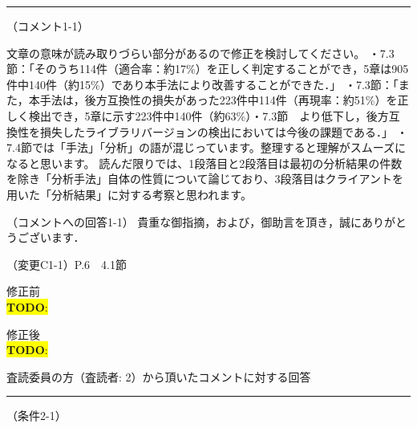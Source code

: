 \documentclass{jarticle} %
\newcommand{\todo}[1]{\colorbox{yellow}{{\bf TODO}:}{\color{red}{\textbf{[#1]}}}}
\def\section#1{ \vspace{3pc} {\large \gt #1} \vspace{1pc} \hrule }
\def\subsection#1{ \vspace{1pc} {\gt #1} }
\def\nextans{ \vspace{2pc} \hrule }
\begin{document}
\newpage
\nextans
\subsection{（コメント1-1）}

文章の意味が読み取りづらい部分があるので修正を検討してください。
・7.3節：「そのうち114件（適合率：約17\%）を正しく判定することができ，5章は905件中140件（約15\%）であり本手法により改善することができた．」
・7.3節：「また，本手法は，後方互換性の損失があった223件中114件（再現率：約51\%）を正しく検出でき，5章に示す223件中140件（約63\%）・7.3節　より低下し，後方互換性を損失したライブラリバージョンの検出においては今後の課題である．」
・7.4節では「手法」「分析」の語が混じっています。整理すると理解がスムーズになると思います。
読んだ限りでは、1段落目と2段落目は最初の分析結果の件数を除き「分析手法」自体の性質について論じており、3段落目はクライアントを用いた「分析結果」に対する考察と思われます。

\subsection{（コメントへの回答1-1）}
貴重な御指摘，および，御助言を頂き，誠にありがとうございます．

\newpage
\subsection{（変更C1-1）P.6　4.1節}
\vspace{-0.3cm}
\begin{description}
\item 修正前\\
\phantom{　}
\todo{hoge}
\vspace{-0.3cm}
\item 修正後\\
\phantom{　}
\todo{hoge}
\end{description}


\newpage
\section{査読委員の方（査読者: 2）から頂いたコメントに対する回答}
\subsection{（条件2-1）}
\end{document}
